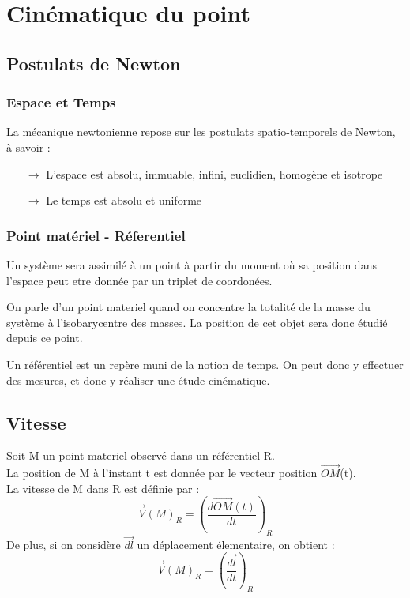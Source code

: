 \chapter{Cinématique du point}
\section{Postulats de Newton}
\subsection{Espace et Temps}
La mécanique newtonienne repose sur les postulats spatio-temporels de Newton, à savoir :
\begin{itemize}
 \item[$\rightarrow$] L'espace est absolu, immuable, infini, euclidien, homogène et isotrope
 \item[$\rightarrow$] Le temps est absolu et uniforme
\end{itemize}
\subsection{Point matériel - Réferentiel}
\begin{de}
Un système sera assimilé à un point à partir du moment où sa position dans l'espace peut etre donnée par un triplet de coordonées.
\end{de}
\begin{de}
On parle d'un point materiel quand on concentre la totalité de la masse du système à l'isobarycentre des masses. La position de cet objet sera donc étudié depuis ce point.
\end{de}
\begin{de}
Un référentiel est un repère muni de la notion de temps. On peut donc y effectuer des mesures, et donc y réaliser une étude cinématique.
\end{de}
\section{Vitesse}
\begin{de}
Soit M un point materiel observé dans un référentiel R.\\
La position de M à l'instant t est donnée par le vecteur position $\overrightarrow{OM}$(t).\\
La vitesse de M dans R est définie par :
$$\overrightarrow{V}(M)_R = \left( \dfrac{d\overrightarrow{OM}(t)}{dt}\right)_R $$
De plus, si on considère $\overrightarrow{dl}$ un déplacement élementaire, on obtient :
$$\overrightarrow{V}(M)_R = \left( \dfrac{\overrightarrow{dl}}{dt}\right)_R $$
\end{de}
